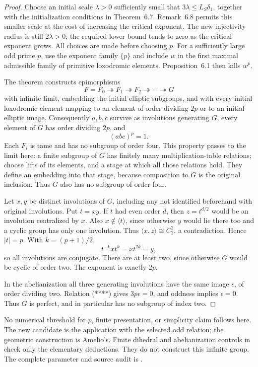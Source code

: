 \begin{proof}
Choose an initial scale \(\lambda>0\) sufficiently small that
\(3\lambda\le L_S\delta_1\), together with the initialization
conditions in Theorem~6.7. Remark~6.8 permits this smaller scale
at the cost of increasing the critical exponent.
The new injectivity radius is still \(2\lambda>0\); the required
lower bound tends to zero as the critical exponent grows.
All choices are made before choosing \(p\).
For a sufficiently large odd prime \(p\), use the exponent family
\(\{p\}\) and include \(w\) in the first maximal admissible family
of primitive loxodromic elements.
Proposition~6.1 then kills \(w^p\).

The theorem constructs epimorphisms
\[
 F=F_0\twoheadrightarrow F_1\twoheadrightarrow F_2
 \twoheadrightarrow\cdots\twoheadrightarrow G
\]
with infinite limit, embedding the initial elliptic subgroups,
and with every initial loxodromic element mapping to an element
of order dividing \(2p\) or to an initial elliptic image.
Consequently \(a,b,c\) survive as involutions generating \(G\),
every element of \(G\) has order dividing \(2p\), and
\[
 (abc)^p=1.                                           \tag{****}
\]
Each \(F_i\) is tame and has no subgroup of order four.
This property passes to the limit here: a finite subgroup of \(G\)
has finitely many multiplication-table relations; choose lifts of
its elements, and a stage at which all those relations hold.
They define an embedding into that stage, because composition to
\(G\) is the original inclusion.
Thus \(G\) also has no subgroup of order four.

Let \(x,y\) be distinct involutions of \(G\), including any not
identified beforehand with original involutions. Put \(t=xy\).
If \(t\) had even order \(d\), then \(z=t^{d/2}\) would be an
involution centralized by \(x\).
Also \(x\notin\langle t\rangle\), since otherwise \(y\) would lie
there too and a cyclic group has only one involution.
Thus \(\langle x,z\rangle\cong C_2^2\), a contradiction.
Hence \(|t|=p\). With \(k=(p+1)/2\),
\[
 t^{-k}xt^k=xt^{2k}=y,
\]
so all involutions are conjugate. There are at least two, since
otherwise \(G\) would be cyclic of order two. The exponent is exactly
\(2p\).

In the abelianization all three generating involutions have the same
image \(\epsilon\), of order dividing two. Relation (****) gives
\(3p\epsilon=0\), and oddness implies \(\epsilon=0\).
Thus \(G\) is perfect, and in particular has no subgroup of index two.
\end{proof}

No numerical threshold for \(p\), finite presentation, or simplicity
claim follows here. The new candidate is the application with the
selected odd relation; the geometric construction is Amelio's.
Finite dihedral and abelianization controls in
 check only the elementary
deductions. They do not construct this infinite group.
The complete parameter and source audit is
.

